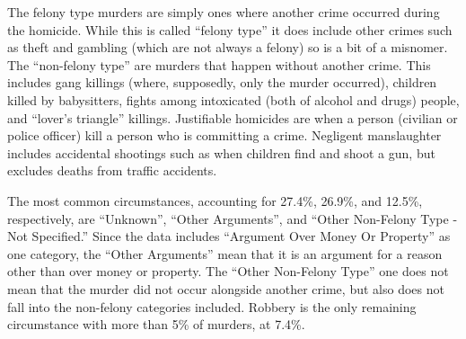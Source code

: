 \documentclass[
]{krantz}
\begin{document}
The felony type murders are simply ones where another crime
occurred during the homicide. While this is called ``felony
type'' it does include other crimes such as theft and
gambling (which are not always a felony) so is a bit of a
misnomer. The ``non-felony type'' are murders that happen
without another crime. This includes gang killings (where,
supposedly, only the murder occurred), children killed by
babysitters, fights among intoxicated (both of alcohol and
drugs) people, and ``lover's triangle'' killings.
Justifiable homicides are when a person (civilian or police
officer) kill a person who is committing a crime. Negligent
manslaughter includes accidental shootings such as when
children find and shoot a gun, but excludes deaths from
traffic accidents.

The most common circumstances, accounting for 27.4\%,
26.9\%, and 12.5\%, respectively, are ``Unknown'', ``Other
Arguments'', and ``Other Non-Felony Type - Not Specified.''
Since the data includes ``Argument Over Money Or Property''
as one category, the ``Other Arguments'' mean that it is an
argument for a reason other than over money or property. The
``Other Non-Felony Type'' one does not mean that the murder
did not occur alongside another crime, but also does not
fall into the non-felony categories included. Robbery is the
only remaining circumstance with more than 5\% of murders,
at 7.4\%.
\end{document}
